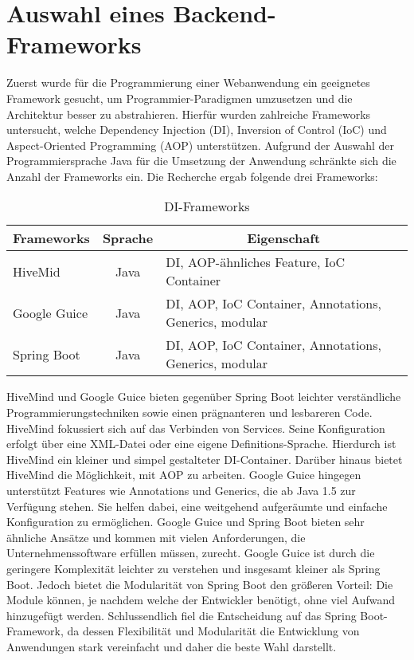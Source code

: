 

\section{Auswahl eines Backend-Frameworks}
Zuerst wurde für die Programmierung einer Webanwendung ein geeignetes Framework gesucht, um Programmier-Paradigmen umzusetzen und die Architektur besser zu abstrahieren. 
Hierfür wurden zahlreiche Frameworks untersucht, welche Dependency Injection (DI), Inversion of Control (IoC) und Aspect-Oriented Programming (AOP) unterstützen.
Aufgrund der Auswahl der Programmiersprache Java für die Umsetzung der Anwendung schränkte sich die Anzahl der Frameworks ein.
Die Recherche ergab folgende drei Frameworks:

\begin{table}[h!]
	\centering
	
	\begin{tabularx}{\textwidth}{|l|c|X|}
		
		\hline
		\multicolumn{1}{|c|}{{\textbf{Frameworks}}} & \multicolumn{1}{c|}{{\textbf{Sprache}}} & \multicolumn{1}{c|}{{\textbf{Eigenschaft}}} \\
		\hline	     
		
		HiveMid & Java & DI, AOP-ähnliches Feature, IoC Container \\
		
		Google Guice & Java & DI, AOP, IoC Container,  Annotations, Generics, modular\\
		
		Spring Boot & Java & DI, AOP, IoC Container,  Annotations, Generics, modular\\
		\hline
	\end{tabularx}
	\caption{DI-Frameworks}
	\label{tbl:diFrameworks}
\end{table}

HiveMind und Google Guice bieten gegenüber Spring Boot leichter verständliche Programmierungstechniken sowie einen prägnanteren und lesbareren Code.
HiveMind fokussiert sich auf das Verbinden von Services. 
Seine Konfiguration erfolgt über eine XML-Datei oder eine eigene Definitions-Sprache. 
Hierdurch ist HiveMind ein kleiner und simpel gestalteter DI-Container.
Darüber hinaus  bietet HiveMind die Möglichkeit, mit AOP zu arbeiten.
Google Guice hingegen unterstützt Features wie Annotations und Generics, die ab Java 1.5 zur Verfügung stehen. 
Sie helfen dabei, eine weitgehend aufgeräumte und einfache Konfiguration zu ermöglichen.
Google Guice und Spring Boot bieten sehr ähnliche Ansätze und kommen mit vielen Anforderungen, die Unternehmenssoftware erfüllen müssen, zurecht.
Google Guice ist durch die geringere Komplexität leichter zu verstehen und insgesamt kleiner als Spring Boot.
Jedoch bietet die Modularität von Spring Boot den größeren Vorteil:
Die Module können, je nachdem welche der Entwickler benötigt, ohne viel Aufwand hinzugefügt werden.
Schlussendlich fiel die Entscheidung auf das Spring Boot-Framework, da dessen Flexibilität und Modularität die Entwicklung von Anwendungen stark vereinfacht und daher die beste Wahl darstellt.

